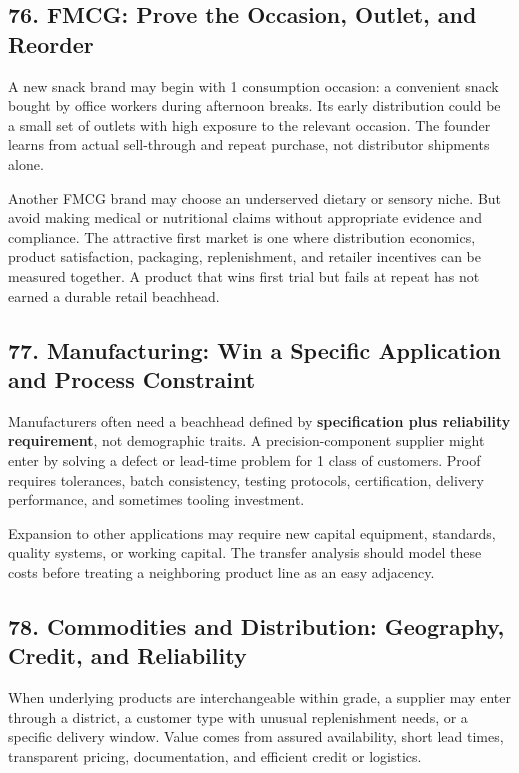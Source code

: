 \subsection*{76. FMCG: Prove the Occasion, Outlet, and Reorder}

A new snack brand may begin with 1 consumption occasion: a convenient snack bought by office workers during afternoon breaks. Its early distribution could be a small set of outlets with high exposure to the relevant occasion. The founder learns from actual sell-through and repeat purchase, not distributor shipments alone.

Another FMCG brand may choose an underserved dietary or sensory niche. But avoid making medical or nutritional claims without appropriate evidence and compliance. The attractive first market is one where distribution economics, product satisfaction, packaging, replenishment, and retailer incentives can be measured together. A product that wins first trial but fails at repeat has not earned a durable retail beachhead.

\subsection*{77. Manufacturing: Win a Specific Application and Process Constraint}

Manufacturers often need a beachhead defined by \textbf{specification plus reliability requirement}, not demographic traits. A precision-component supplier might enter by solving a defect or lead-time problem for 1 class of customers. Proof requires tolerances, batch consistency, testing protocols, certification, delivery performance, and sometimes tooling investment.

Expansion to other applications may require new capital equipment, standards, quality systems, or working capital. The transfer analysis should model these costs before treating a neighboring product line as an easy adjacency.

\subsection*{78. Commodities and Distribution: Geography, Credit, and Reliability}

When underlying products are interchangeable within grade, a supplier may enter through a district, a customer type with unusual replenishment needs, or a specific delivery window. Value comes from assured availability, short lead times, transparent pricing, documentation, and efficient credit or logistics.

